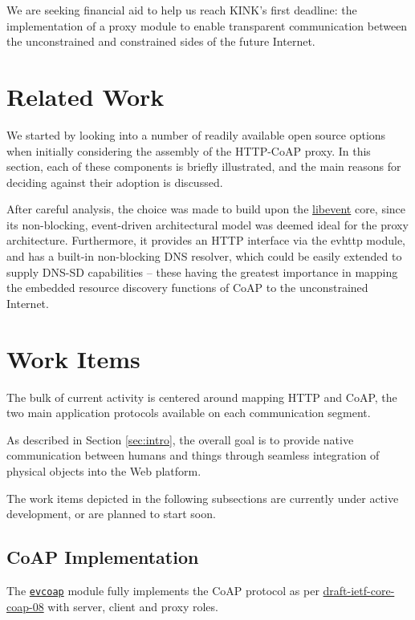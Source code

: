 \documentclass[12pt]{article}
\newcommand{\swmod}[1]{\mbox{\texttt{#1}}}
\begin{document}
We are seeking financial aid to help us reach KINK's first deadline: the implementation of a proxy module to enable transparent communication between the unconstrained and constrained sides of the future Internet.

\section{Related Work}
We started by looking into a number of readily available open source options when initially considering the assembly of the HTTP-CoAP proxy.  In this section, each of these components is briefly illustrated, and the main reasons for deciding against their adoption is discussed.

After careful analysis, the choice was made to build upon the \href{http://libevent.org}{libevent} core, since its non-blocking, event-driven architectural model was deemed ideal for the proxy architecture.  Furthermore, it provides an HTTP interface via the evhttp module, and has a built-in non-blocking DNS resolver, which could be easily extended to supply DNS-SD capabilities -- these having the greatest importance in mapping the embedded resource discovery functions of CoAP to the unconstrained \mbox{Internet}.



\section{Work Items}
The bulk of current activity is centered around mapping HTTP and CoAP, the two main application protocols available on each communication segment.

As described in Section \ref{sec:intro}, the overall goal is to provide native communication between humans and things through seamless integration of physical objects into the Web platform.

The work items depicted in the following subsections are currently under active development, or are planned to start soon.

\subsection{CoAP Implementation}
The \href{https://github.com/koanlogic/webthings/tree/master/bits/evcoap}{\swmod{evcoap}} module fully implements the CoAP protocol as per \href{http://tools.ietf.org/html/draft-ietf-core-coap}{draft-ietf-core-coap-08} with server, client and proxy roles.
\end{document}
